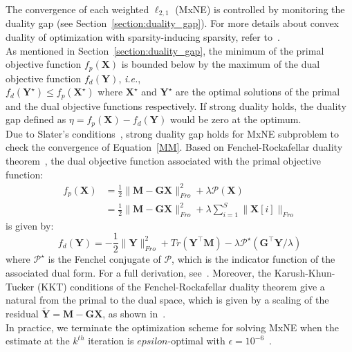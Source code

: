 The convergence of each weighted $\ell_{2,1}$ (MxNE) is controlled by monitoring the duality gap (see Section~\ref{section:duality_gap}). For more details about convex duality of optimization with sparsity-inducing sparsity, refer to~\cite{bach2012optimization}.\\
As mentioned in Section~\ref{section:duality_gap}, the minimum of the primal objective function $f_p(\mathbf{X})$ is bounded below by the maximum of the dual objective function $f_d(\mathbf{Y})$, \textit{i.e.},\\
$f_d(\mathbf{Y}^\star)\leq f_p(\mathbf{X}^\star)$ where $\mathbf{X}^\star$ and $\mathbf{Y}^\star$ are the optimal solutions of the primal and the dual objective functions respectively. If strong duality holds, the duality gap defined as $\eta=f_p(\mathbf{X})-f_d(\mathbf{Y})$ would be zero at the optimum.\\
Due to Slater's conditions~\cite{Boyd_Vandenberghe04}, strong duality gap holds for MxNE subproblem to check the convergence of Equation~\eqref{MM}. Based on Fenchel-Rockafellar duality theorem~\cite{rockafellar:1997}, the dual objective function associated with the primal objective function:
\begin{equation}
\begin{split}
f_p(\mathbf{X}) & = \frac{1}{2}\|\mathbf{M}-\mathbf{GX}\|_{Fro}^2+\lambda\mathcal{P}(\mathbf{X}) \\
& = \frac{1}{2}\|\mathbf{M}-\mathbf{GX}\|_{Fro}^2+\lambda\sum_{i=1}^S\|\mathbf{X}[i]\|_{Fro}
\end{split}
\end{equation}
is given by:
\begin{equation}
f_d(\mathbf{Y})=-\frac{1}{2}\|\mathbf{Y}\|_{Fro}^2+Tr(\mathbf{Y}^\top\mathbf{M})-\lambda\mathcal{P}^\star(\mathbf{G}^\top\mathbf{Y}/\lambda)
\end{equation}
where $\mathcal{P}^\star$ is the Fenchel conjugate of $\mathcal{P}$, which is the indicator function of the associated dual form. For a full derivation, see~\cite{Gramfort_Kowalski_Hamalainen12}. Moreover, the Karush-Khun-Tucker (KKT) conditions of the Fenchel-Rockafellar duality theorem give a natural from
the primal to the dual space, which is given by a scaling of the residual $\tilde{\mathbf{Y}}=\mathbf{M}-\mathbf{GX}$, as shown in~\cite{Gramfort_Kowalski_Hamalainen12}.\\
In practice, we terminate the optimization scheme for solving MxNE when the estimate at the $k^{th}$ iteration is $epsilon$-optimal with $\epsilon=10^{-6}$~\cite{strohmeier-etal:16}.\\

